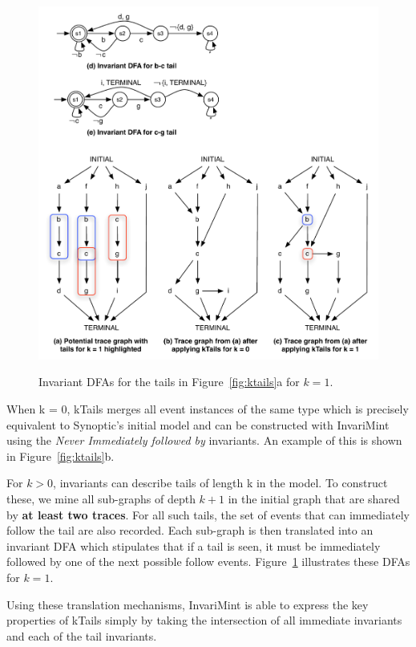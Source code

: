 \begin{figure}
   \center
   {\includegraphics[width=0.95\columnwidth]{fig/tails.pdf}}
   \caption{Invariant DFAs for the tails in Figure~\ref{fig:ktails}a for
   $k = 1$.}
   \label{fig:tails}
\end{figure}


When k = 0, kTails merges all event instances of the same type which is
precisely equivalent to Synoptic's initial model and can be constructed with
InvariMint using the \emph{Never Immediately followed by} invariants. An example
of this is shown in Figure~\ref{fig:ktails}b.

For $k > 0$, invariants can describe tails of length k in
the model. To construct these, we mine all sub-graphs of depth $k + 1$ in the initial graph
that are shared by \textbf{at least two traces}. For all such tails, the set of
events that can immediately follow the tail are also recorded.
Each sub-graph is then translated into
an invariant DFA which stipulates that if a tail is seen, it must be immediately followed by
one of the next possible follow events. Figure~\ref{fig:tails} illustrates
these DFAs for $k = 1$.

Using these translation mechanisms, InvariMint is able to express the key properties
of kTails simply by taking the
intersection of all immediate invariants and each of the tail
invariants.

